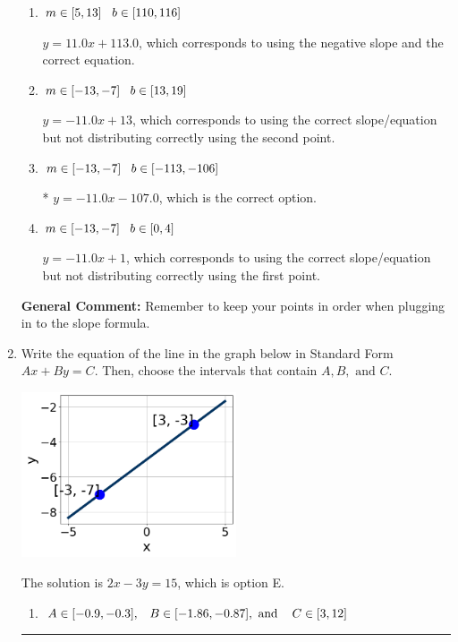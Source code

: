 \documentclass{extbook}[14pt]
\newcommand{\litem}[1]{\item #1

\rule{\textwidth}{0.4pt}}
\begin{document}
\begin{enumerate}
{\begin{enumerate}[label=\Alph*.]
 $y = -11.0x + 107.0$, which corresponds to using the correct slope and getting the negative y-intercept.
\item \( m \in [5, 13] \hspace*{3mm} b \in [110, 116] \)

 $y = 11.0x + 113.0$, which corresponds to using the negative slope and the correct equation.
\item \( m \in [-13, -7] \hspace*{3mm} b \in [13, 19] \)

 $y = -11.0x + 13$, which corresponds to using the correct slope/equation but not distributing correctly using the second point.
\item \( m \in [-13, -7] \hspace*{3mm} b \in [-113, -106] \)

* $y = -11.0x -107.0$, which is the correct option.
\item \( m \in [-13, -7] \hspace*{3mm} b \in [0, 4] \)

 $y = -11.0x + 1$, which corresponds to using the correct slope/equation but not distributing correctly using the first point.
\end{enumerate}

\textbf{General Comment:} Remember to keep your points in order when plugging in to the slope formula.
}
\litem{
Write the equation of the line in the graph below in Standard Form $Ax+By=C$. Then, choose the intervals that contain $A, B, \text{ and } C$.

\begin{center}
    \includegraphics[width=0.5\textwidth]{../Figures/linearGraphToStandardB.png}
\end{center}


The solution is \( 2x - 3y = 15 \), which is option E.\begin{enumerate}[label=\Alph*.]
\item \( A \in [-0.9, -0.3], \hspace{3mm} B \in [-1.86, -0.87], \text{ and } \hspace{3mm} C \in [3, 12] \)


\end{enumerate}}
\end{enumerate}
\end{document}
